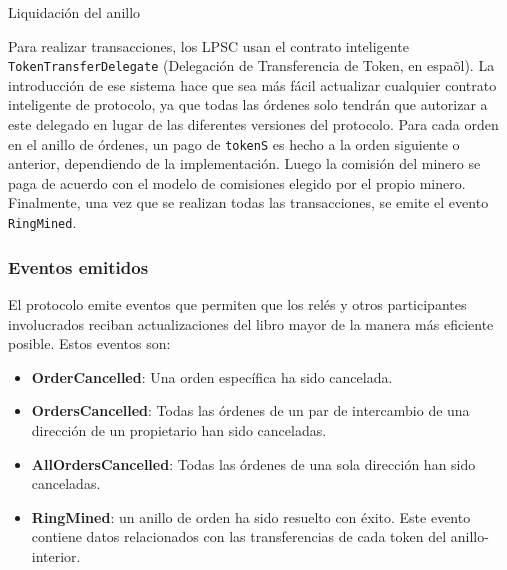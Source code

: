 \documentclass[UTF8,nofonts]{article}
\makeatletter
\newenvironment{figurehere}
 {\def\@captype{figure}}
 {}
\makeatother
\begin{document}
\begin{multicols}{2}
\begin{center}
\begin{figurehere}
\caption{Liquidaci\'on del anillo}
\label{fig:settlement}
\end{figurehere}
\end{center}

Para realizar transacciones, los LPSC usan el contrato inteligente \verb|TokenTransferDelegate| (Delegaci\'on de Transferencia de Token, en espa\~ol). La introducci\'on de ese sistema hace que sea m\'as f\'acil actualizar cualquier contrato inteligente de protocolo, ya que todas las \'ordenes solo tendr\'an que autorizar a este delegado en lugar de las diferentes versiones del protocolo. Para cada orden en el anillo de \'ordenes, un pago de \verb|tokenS| es hecho a la orden siguiente o anterior, dependiendo de la implementaci\'on. Luego la comisi\'on del minero se paga de acuerdo con el modelo de comisiones elegido por el propio minero. Finalmente, una vez que se realizan todas las transacciones, se emite el evento \verb|RingMined|.



\subsubsection{Eventos emitidos\label{sec:events}}

El protocolo emite eventos que permiten que los rel\'es y otros participantes involucrados reciban actualizaciones del libro mayor de la manera m\'as eficiente posible. Estos eventos son:

\begin{itemize}
	\item \textbf{OrderCancelled}: Una orden espec\'ifica ha sido cancelada.
	\item \textbf{OrdersCancelled}: Todas las \'ordenes de un par de intercambio de una direcci\'on de un propietario han sido canceladas.
	\item \textbf{AllOrdersCancelled}: Todas las \'ordenes de una sola direcci\'on han sido canceladas.
	\item \textbf{RingMined}: un anillo de orden ha sido resuelto con \'exito. Este evento contiene datos relacionados con las transferencias de cada token del anillo-interior.
\end{itemize}


\end{multicols}
\end{document}
